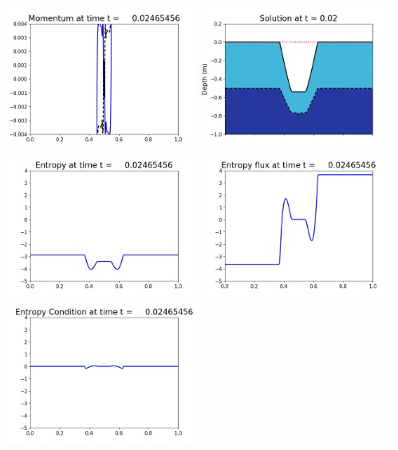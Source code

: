 \documentclass[11pt]{article}
\begin{document}
\vskip 10pt 
\includegraphics[width=0.475\textwidth]{frame0071fig1003.png}
\includegraphics[width=0.475\textwidth]{frame0071fig1006.png}
\vskip 10pt 
\includegraphics[width=0.475\textwidth]{frame0071fig1007.png}
\includegraphics[width=0.475\textwidth]{frame0071fig1008.png}
\vskip 10pt 
\includegraphics[width=0.475\textwidth]{frame0071fig1009.png}
\end{document}
